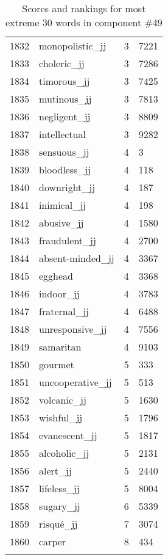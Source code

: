 \begin{longtable}[!htbp]{| rlr@{.}l |}
    1832 & monopolistic\_jj & 3 & 7221 \\
    1833 & choleric\_jj & 3 & 7286 \\
    1834 & timorous\_jj & 3 & 7425 \\
    1835 & mutinous\_jj & 3 & 7813 \\
    1836 & negligent\_jj & 3 & 8809 \\
    1837 & intellectual & 3 & 9282 \\
    1838 & sensuous\_jj & 4 & 3 \\
    1839 & bloodless\_jj & 4 & 118 \\
    1840 & downright\_jj & 4 & 187 \\
    1841 & inimical\_jj & 4 & 198 \\
    1842 & abusive\_jj & 4 & 1580 \\
    1843 & fraudulent\_jj & 4 & 2700 \\
    1844 & absent-minded\_jj & 4 & 3367 \\
    1845 & egghead & 4 & 3368 \\
    1846 & indoor\_jj & 4 & 3783 \\
    1847 & fraternal\_jj & 4 & 6488 \\
    1848 & unresponsive\_jj & 4 & 7556 \\
    1849 & samaritan & 4 & 9103 \\
    1850 & gourmet & 5 & 333 \\
    1851 & uncooperative\_jj & 5 & 513 \\
    1852 & volcanic\_jj & 5 & 1630 \\
    1853 & wishful\_jj & 5 & 1796 \\
    1854 & evanescent\_jj & 5 & 1817 \\
    1855 & alcoholic\_jj & 5 & 2131 \\
    1856 & alert\_jj & 5 & 2440 \\
    1857 & lifeless\_jj & 5 & 8004 \\
    1858 & sugary\_jj & 6 & 5339 \\
    1859 & risqué\_jj & 7 & 3074 \\
    1860 & carper & 8 & 434 \\
    \hline
    \caption{Scores and rankings for most extreme 30 words in component \#49} \\
\end{longtable}
